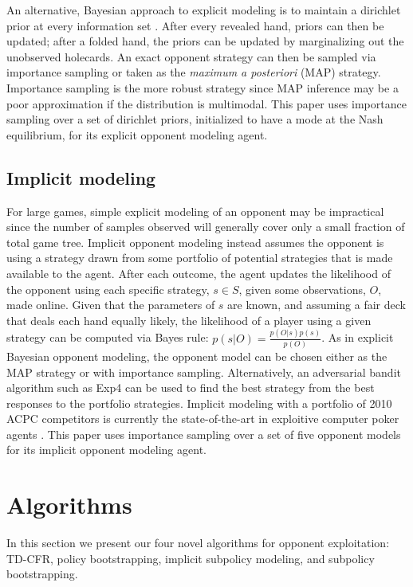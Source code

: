 \documentclass{aamas2013}
\begin{document}
    An alternative, Bayesian approach to explicit modeling is to maintain a dirichlet prior at every information set \cite{bayesbluff,shortterm}. After every revealed hand, priors can then be updated; after a folded hand, the priors can be updated by marginalizing out the unobserved holecards. An exact opponent strategy can then be sampled via importance sampling or taken as the \textit{maximum a posteriori} (MAP) strategy. Importance sampling is the more robust strategy since MAP inference may be a poor approximation if the distribution is multimodal. This paper uses importance sampling over a set of dirichlet priors, initialized to have a mode at the Nash equilibrium, for its explicit opponent modeling agent.
    
    \subsection{Implicit modeling}
    For large games, simple explicit modeling of an opponent may be impractical since the number of samples observed will generally cover only a small fraction of total game tree. Implicit opponent modeling \cite{shortterm} instead assumes the opponent is using a strategy drawn from some portfolio of potential strategies that is made available to the agent. After each outcome, the agent updates the likelihood of the opponent using each specific strategy, $s \in S$, given some observations, $O$, made online. Given that the parameters of $s$ are known, and assuming a fair deck that deals each hand equally likely, the likelihood of a player using a given strategy can be computed via Bayes rule: $p(s | O) = \frac{p(O | s)p(s)}{p(O)}$. As in explicit Bayesian opponent modeling, the opponent model can be chosen either as the MAP strategy or with importance sampling. Alternatively, an adversarial bandit algorithm such as Exp4 \cite{exp4} can be used to find the best strategy from the best responses to the portfolio strategies. Implicit modeling with a portfolio of 2010 ACPC competitors is currently the state-of-the-art in exploitive computer poker agents \cite{implicit}. This paper uses importance sampling over a set of five opponent models for its implicit opponent modeling agent.

\section{Algorithms}
In this section we present our four novel algorithms for opponent exploitation: TD-CFR, policy bootstrapping, implicit subpolicy modeling, and subpolicy bootstrapping.
\end{document}
